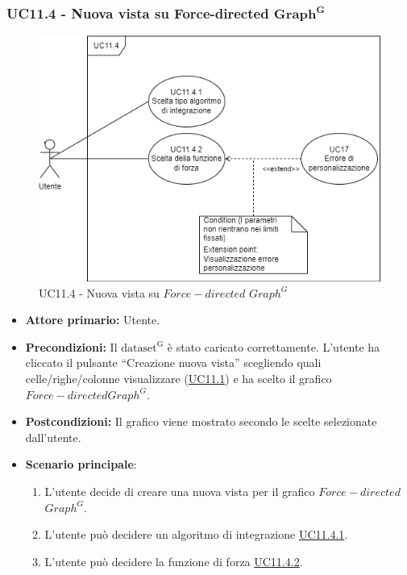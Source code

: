 \subsubsection{UC11.4 - Nuova vista su Force-directed ${\mathbf{Graph^{G}}}$}
\label{sec:UC11.4}
\begin{figure}[h!]
	\centering
	\includegraphics[scale=0.60]{../../assets/creazionevista_force.png}
	\caption{UC11.4 - Nuova vista su $Force-directed$ $Graph^{G}$}
\end{figure}
\begin{itemize}
    \item \textbf{Attore primario:} Utente.
    \item \textbf{Precondizioni:} Il ${\mathrm{dataset^{G}}}$ è stato caricato correttamente. L'utente ha cliccato il pulsante ``Creazione nuova vista'' scegliendo quali celle/righe/colonne visualizzare (\hyperref[sec:UC11.1]{UC11.1}) e ha scelto il grafico $Force-directed Graph^{G}$.
    \item \textbf{Postcondizioni:} Il grafico viene mostrato secondo le scelte selezionate dall'utente.
    \item \textbf{Scenario principale}:
    \begin{enumerate}
		\item L'utente decide di creare una nuova vista per il grafico $Force-directed$ $Graph^{G}$.
		\item L'utente può decidere un algoritmo di integrazione \hyperref[sec:UC11.4.1]{UC11.4.1}.
		\item L'utente può decidere la funzione di forza \hyperref[sec:UC11.4.2]{UC11.4.2}.
	\end{enumerate}
\end{itemize}

